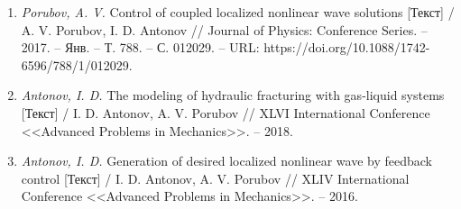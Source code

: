 \begin{enumerate}
\item \textit{Porubov, A. V.} Control of coupled localized nonlinear wave solutions [Текст] /
A. V. Porubov, I. D. Antonov // Journal of Physics: Conference Series. --
2017. -- Янв. -- Т. 788. -- С. 012029. -- URL: https://doi.org/10.1088/1742-
6596/788/1/012029.

\item \textit{Antonov, I. D.} The modeling of hydraulic fracturing with gas-liquid systems [Текст] / I. D. Antonov, A. V. Porubov // XLVI International Conference
<<Advanced Problems in Mechanics>>. -- 2018.

\item \textit{Antonov, I. D.} Generation of desired localized nonlinear wave by feedback control [Текст] / I. D. Antonov, A. V. Porubov // XLIV International Conference
<<Advanced Problems in Mechanics>>. -- 2016.

\end{enumerate}

\vspace{5pt}
